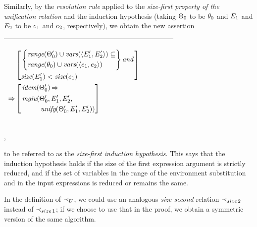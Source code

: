 \documentclass[runningheads]{llncs}
\DeclareMathOperator{\uand}{\emph{and}\,}
\DeclareMathOperator{\uimplies}{\Rightarrow}
\DeclareMathOperator{\unify}{\emph{unify}}
\DeclareMathOperator{\idem}{\emph{idem}}
\DeclareMathOperator{\mgiu}{\emph{mgiu}}
\begin{document}
Similarly, by the \emph{resolution rule} applied to the \emph{size-first property of the unification relation} and the induction hypothesis (taking $\Theta_{0}$ to be $\theta_{0}$ and $E_{1}$ and $E_{2}$ to be $e_{1}$ and $e_{2}$, respectively), we obtain the new assertion

  \begin{center}
  \begin{tabular}{|m{}|m{}||m{}|}
\hline
\begin{center}
{$\begin{aligned}
 &\begin{aligned}
&\begin{aligned}
&\left[\begin{aligned}
 &\left\{\begin{aligned}
 &\range(\Thet{0}')\cup\vars(\langle \E{1}', \E{2}' \rangle) \subseteq \\
  &\range(\thet{0})\cup\vars(\langle \e{1}, \e{2} \rangle) 
  \end{aligned}\right\} \uand  \\
  &\size(\E{1}') < \size(\e{1})
  \end{aligned} \right] 
  \end{aligned} 
\end{aligned} \\
 \uimplies &\left[\begin{aligned}&\idem(\Thet{0}') \uimplies \\
 &\begin{aligned}
    {\,\mgiu}(&\Thet{0}', \E{1}', \E{2}', \\
    &\unify(\Thet{0}', \E{1}', \E{2}')) 
\end{aligned}
\end{aligned}\right] \end{aligned}  $}  \hspace{1cm} 
\end{center}& &  \\  \hline
\end{tabular},
\end{center}
to be referred to as the \emph{size-first induction hypothesis}. This says that the induction hypothesis holds if the size of the first expression argument is strictly reduced, and if the  set of variables in the range of the environment substitution and in the input expressions is reduced or remains the same.

In the definition of  ${\prec}_{U}$, we could use an
 analogous \emph{size-second} relation ${\prec}_{size \, 2}$ instead of ${\prec}_{size \, 1}$; if we choose to use that in the proof, we obtain a symmetric version of the same algorithm.
\end{document}
